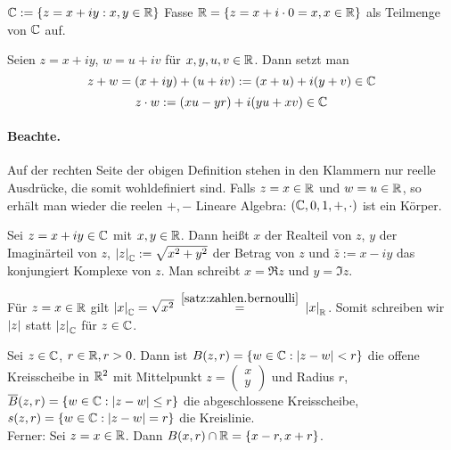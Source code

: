 \documentclass[12pt]{scrreprt}
\begin{document}
\begin{dfn*}
$\mathbb{C} := \{z=x+iy : x,y \in \mathbb{R}\}$
Fasse $\mathbb{R} = \{z=x+i\cdot 0=x, x\in\mathbb{R}\}$ als Teilmenge von $\mathbb{C}$ auf.
\end{dfn*}

Seien $z=x+iy$, $w=u+iv$ für $x,y,u,v \in \mathbb{R}$.
Dann setzt man
$$ z+w = (x+iy) + (u+iv) := (x+u) + i(y+v) \in \mathbb{C}$$
$$ z\cdot w := (xu-yr) + i(yu+xv) \in \mathbb{C}$$
\paragraph{Beachte.} Auf der rechten Seite der obigen Definition stehen in den Klammern nur reelle Ausdrücke, die somit wohldefiniert sind.
Falls $z=x \in \mathbb{R}$ und $w=u \in \mathbb{R}$, so erhält man wieder die reelen $+, -$
Lineare Algebra: $(\mathbb{C},0,1,+,\cdot)$ ist ein Körper.

\begin{dfn}\label{dfn:zahlen.komplex}
Sei $z=x+iy \in \mathbb{C} $ mit $x,y \in \mathbb{R}$. Dann heißt $x$ der Realteil von $z$, $y$ der Imaginärteil von $z$, 
$\left\lvert z\right\lvert_{\mathbb{C}} := \sqrt{x^2+y^2}$ der Betrag von $z$ und $\bar{z}:=x-iy$ das konjungiert Komplexe von $z$.
Man schreibt $x = \Re{z}$ und $ y = \Im{z}$.

\begin{bem*}
Für $z = x \in \mathbb{R}$ gilt $\abs{x}_\set{C} = \sqrt{x^2} \wegen{=}{\ref{satz:zahlen.bernoulli}} \abs{x}_\set{R}$.
Somit schreiben wir $\left\lvert z\right\lvert$ statt $\left\lvert z\right\lvert_{\mathbb{C}}$ für $z \in \mathbb{C}$.
\end{bem*}
Sei $z \in \mathbb{C}$, $r \in \mathbb{R}, r>0$. Dann ist $B(z,r) = \{w \in \mathbb{C}:\left\lvert z-w\right\lvert<r\}$
die offene Kreisscheibe in $\mathbb{R}^2$ mit Mittelpunkt $z = \begin{pmatrix} x \\ y \end{pmatrix}$ und Radius
$r$, $\overline{B}(z,r)   = \{w \in \mathbb{C}:\left\lvert z-w\right\lvert\le r\}$ die abgeschlossene Kreisscheibe,
$s(z,r)   = \{w \in \mathbb{C}:\left\lvert z-w\right\lvert= r\}$ die Kreislinie.\\
Ferner: Sei $z = x \in \mathbb{R}$. Dann $ B(x,r) \cap \mathbb{R} = \{x-r, x+r\}$.
\end{dfn}
\end{document}
